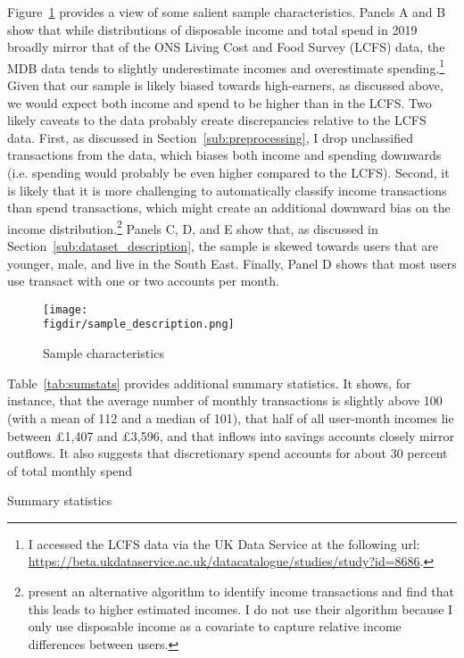 Figure~\ref{fig:sample_description} provides a view of some salient sample
characteristics. Panels A and B show that while distributions of disposable
income and total spend in 2019 broadly mirror that of the ONS Living Cost and
Food Survey (LCFS) data, the MDB data tends to slightly underestimate incomes
and overestimate spending.\footnote{I accessed the LCFS data via the UK Data
Service at the following url:
\url{https://beta.ukdataservice.ac.uk/datacatalogue/studies/study?id=8686}.}
Given that our sample is likely biased towards high-earners, as discussed
above, we would expect both income and spend to be higher than in the LCFS. Two
likely caveats to the data probably create discrepancies relative to the LCFS
data. First, as discussed in Section~\ref{sub:preprocessing}, I drop
unclassified transactions from the data, which biases both income and spending
downwards (i.e. spending would probably be even higher compared to the LCFS).
Second, it is likely that it is more challenging to automatically classify
income transactions than spend transactions, which might create an additional
downward bias on the income distribution.\footnote{\citet{bourquin2020effects}
    present an alternative algorithm to identify income transactions and find
that this leads to higher estimated incomes. I do not use their algorithm
because I only use disposable income as a covariate to capture relative income
differences between users.} Panels C, D, and E show that, as discussed in
Section~\ref{sub:dataset_description}, the sample is skewed towards users that
are younger, male, and live in the South East. Finally, Panel D shows that most
users use transact with one or two accounts per month.

\begin{figure}[H]
    \centering
    \caption{Sample characteristics}
    \texttt{[image: \\figdir/sample\_description.png]}
    \label{fig:sample_description}
\end{figure}

Table~\ref{tab:sumstats} provides additional summary statistics. It shows, for
instance, that the average number of monthly transactions is slightly above 100
(with a mean of 112 and a median of 101), that half of all user-month incomes
lie between \pounds1,407 and \pounds3,596, and that inflows into savings
accounts closely mirror outflows. It also suggests that discretionary
spend accounts for about 30 percent of total monthly spend

\begin{table}[ht]
\centering\tiny
\caption{Summary statistics}
\label{tab:sumstats}

\end{table}

